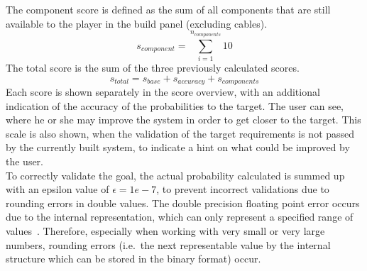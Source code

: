 The component score is defined as the sum of all components that are still available to the player in the build panel (excluding cables).
\begin{equation}
    s_{component} = \sum_{i = 1}^{n_{components}} 10
    \label{eq:component-score}
\end{equation}
The total score is the sum of the three previously calculated scores.
\begin{equation}
    s_{total} = s_{base} + s_{accuracy} + s_{components}
    \label{eq:total-score}
\end{equation}
Each score is shown separately in the score overview, with an additional indication of the accuracy of the probabilities to the target.
The user can see, where he or she may improve the system in order to get closer to the target.
This scale is also shown, when the validation of the target requirements is not passed by the currently built system, to indicate
a hint on what could be improved by the user.
\\
To correctly validate the goal, the actual probability calculated is summed up with an epsilon value of $\epsilon = 1e-7$,
to prevent incorrect validations due to rounding errors in double values.
The double precision floating point error occurs due to the internal representation, which can only represent a specified range of
values~\cite{floating-point}.
Therefore, especially when working with very small or very large numbers, rounding errors (i.e.\ the next representable value by the internal structure which can be stored
in the binary format) occur.
